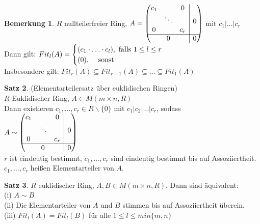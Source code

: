 \documentclass[10pt,a4paper,numbers=endperiod]{scrartcl}
\theoremstyle{definition}
\newtheorem{satz}{Satz}[section]
\newtheorem{bem}[satz]{Bemerkung}
\begin{document}
\begin{bem}
	$R$ nullteilerfreier Ring, $A = \begin{pmatrix}
	c_1 & & 0& \multicolumn{1}{|c}{}\\
	& \ddots & & \multicolumn{1}{|c}{0}\\
	0 & & c_r & \multicolumn{1}{|c}{}\\
	\hline
	& 0 & &\multicolumn{1}{|c}{0}
	\end{pmatrix}$ mit $c_1|\ldots|c_r$\\
	Dann gilt: $Fit_l(A) = \begin{cases}
	(c_1\cdot \ldots \cdot c_l), \text{ falls }1 \leq l \leq r\\
	(0), \hspace{3mm} \text{ sonst}
	\end{cases}$\\
	Insbesondere gilt: $Fit_r(A) \subseteq Fit_{r-1}(A) \subseteq \ldots \subseteq Fit_1(A)$\\
\end{bem}
\newpage
\begin{satz}
	(Elementarteilersatz über euklidischen Ringen)\\
	$R$ Euklidischer Ring, $A \in M(m \times n, R)$\\
	Dann existieren $c_1, \ldots, c_r \in R \backslash \{0\}$ mit $c_1|c_2| \ldots |c_r$, sodass\\
	$A \sim \begin{pmatrix}
	c_1 & & 0& \multicolumn{1}{|c}{}\\
	& \ddots & & \multicolumn{1}{|c}{0}\\
	0 & & c_r & \multicolumn{1}{|c}{}\\
	\hline
	& 0 & &\multicolumn{1}{|c}{0}
	\end{pmatrix}$\\
	$r$ ist eindeutig bestimmt, $c_1, \ldots, c_r$ sind eindeutig bestimmt bis auf Assoziiertheit. $c_1, \ldots, c_r$ heißen Elementarteiler von $A$.
\end{satz}

\begin{satz}
	$R$ euklidischer Ring, $A, B \in M(m \times n, R)$. Dann sind äquivalent:\\
	(i) $A \sim B$\\
	(ii) Die Elementarteiler von $A$ und $B$ stimmen bis auf Assoziiertheit überein.\\
	(iii) $Fit_l(A) = Fit_l(B)$ für alle $1 \leq l \leq min\{m,n\}$
\end{satz}
\end{document}
